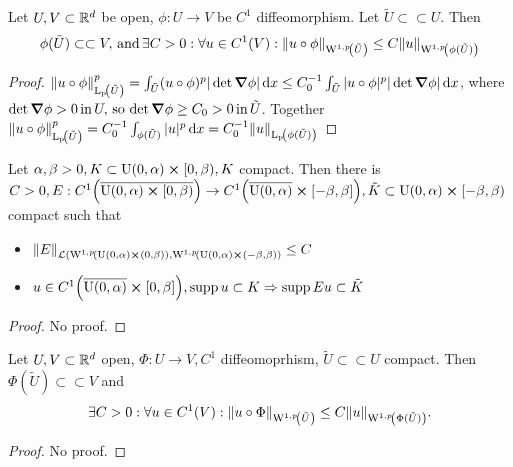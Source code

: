 \documentclass{article}
\begin{document}
\begin{lemma}
	Let $U,V \subset {\mathbb R}^d$ be open, $\phi: U \to V$ be $C^1$ diffeomorphism. Let $\tilde{U} \subset \subset U$. Then
	\[
		\phi(\tilde{U}) \subset \subset V,\, \text{and} \, \exists C>0: \forall u \in C^1(V): \norm{u \circ \phi}_{\WkpSet[1][p]{\tilde{U}}} \leq C \norm{u}_{\WkpSet[1][p]{\phi(\tilde{U})}}
	\]
\end{lemma}

\begin{proof}
	$\norm{u \circ \phi}_{\LpSet{\tilde{U}}}^p = \int_{\tilde{U}}(u \circ \phi)^p |\det \grad \phi| \dd{x} \leq C_0^{-1}\int_{\tilde{U}}|u \circ \phi|^p |\det \grad \phi|\dd{x}$, where $\det \grad \phi >0 \, \text{in} \,U, \, \text{so} \, \det \grad \phi \geq C_0 > 0 \, \text{in} \,\tilde{U}$. Together
	$\norm{u \circ \phi}_{\LpSet{\tilde{U}}}^p = C_0^{-1} \int_{\phi(\tilde{U})}|u|^p\dd{x} = C_0^{-1}\norm{u}_{\LpSet{\phi(\tilde{U})}}$
\end{proof}

\begin{lemma}
	Let $\alpha, \beta >0, K \subset \text{U}(0,\alpha) \cross [0,\beta), K$ compact. Then there is $C>0, E: C^1\qty(\overline{\text{U}(0,\alpha) \cross [0,\beta)}) \to C^1\qty(\overline{\text{U}(0,\alpha)} \cross [-\beta,\beta]), \tilde{K} \subset \text{U}(0,\alpha) \cross [-\beta, \beta)$ compact such that
	\begin{itemize}
		\item $\norm{E}_{\mathcal{L}(\WkpSet[1][p]{\text{U}(0,\alpha) \cross (0,\beta)}, \WkpSet[1][p]{\text{U}(0,\alpha)\cross(-\beta,\beta)}} \leq C$
		\item $u \in C^1\qty(\overline{\text{U}(0,\alpha)} \cross [0,\beta]), \operatorname{supp} u \subset K \Rightarrow \operatorname{supp} Eu \subset \tilde{K}$
	\end{itemize}
\end{lemma}
\begin{proof}
	No proof.
\end{proof}

\begin{lemma}
	Let $U,V \subset {\mathbb R}^d$ open, $\Phi: U \to V, C^1$ diffeomoprhism, $\tilde{U} \subset \subset U$ compact. Then $\Phi(\tilde{U}) \subset \subset V$ and
	\[
		\exists C>0: \forall u \in C^1\qty(V): \norm{u \circ \Phi}_{\WkpSet[1][p]{\tilde{U}}} \leq C \norm{u}_{\WkpSet[1][p]{\Phi(\tilde{U})}}.
	\]

\end{lemma}
\begin{proof}
	No proof.
\end{proof}
\end{document}
